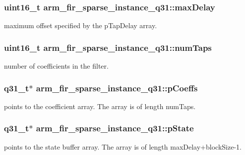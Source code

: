 \subsubsection[{\texorpdfstring{max\+Delay}{maxDelay}}]{\setlength{\rightskip}{0pt plus 5cm}uint16\+\_\+t arm\+\_\+fir\+\_\+sparse\+\_\+instance\+\_\+q31\+::max\+Delay}\hypertarget{structarm__fir__sparse__instance__q31_afdd3a1dc72132c854dc379154b68b674}{}\label{structarm__fir__sparse__instance__q31_afdd3a1dc72132c854dc379154b68b674}
maximum offset specified by the p\+Tap\+Delay array. 
\subsubsection[{\texorpdfstring{num\+Taps}{numTaps}}]{\setlength{\rightskip}{0pt plus 5cm}uint16\+\_\+t arm\+\_\+fir\+\_\+sparse\+\_\+instance\+\_\+q31\+::num\+Taps}\hypertarget{structarm__fir__sparse__instance__q31_a07b6c01e58ec6dde384719130d36b0dc}{}\label{structarm__fir__sparse__instance__q31_a07b6c01e58ec6dde384719130d36b0dc}
number of coefficients in the filter. 
\subsubsection[{\texorpdfstring{p\+Coeffs}{pCoeffs}}]{\setlength{\rightskip}{0pt plus 5cm}q31\+\_\+t$\ast$ arm\+\_\+fir\+\_\+sparse\+\_\+instance\+\_\+q31\+::p\+Coeffs}\hypertarget{structarm__fir__sparse__instance__q31_a093d6227f0d1597982cd083fb126f4e0}{}\label{structarm__fir__sparse__instance__q31_a093d6227f0d1597982cd083fb126f4e0}
points to the coefficient array. The array is of length num\+Taps. 
\subsubsection[{\texorpdfstring{p\+State}{pState}}]{\setlength{\rightskip}{0pt plus 5cm}q31\+\_\+t$\ast$ arm\+\_\+fir\+\_\+sparse\+\_\+instance\+\_\+q31\+::p\+State}\hypertarget{structarm__fir__sparse__instance__q31_a830be89daa5a393b225048889aa045d1}{}\label{structarm__fir__sparse__instance__q31_a830be89daa5a393b225048889aa045d1}
points to the state buffer array. The array is of length max\+Delay+block\+Size-\/1. 
